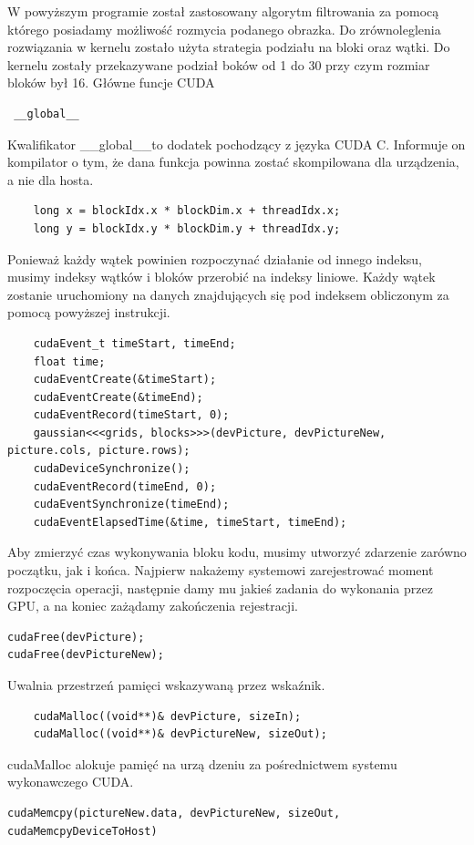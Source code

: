 \documentclass[a4paper,10pt]{article}
\begin{document}
W powyższym programie został zastosowany algorytm filtrowania za pomocą którego posiadamy możliwość rozmycia podanego obrazka. 
Do zrównoleglenia rozwiązania w kernelu zostało użyta strategia podziału na bloki oraz wątki. Do kernelu zostały przekazywane podział boków od 1 do 30 przy czym rozmiar bloków był 16.
\newline
Główne funcje CUDA
\begin{lstlisting}
 __global__
\end{lstlisting}
Kwalifikator \_\_global\_\_to dodatek pochodzący z języka CUDA C. Informuje on kompilator
o tym, że dana funkcja powinna zostać skompilowana dla urządzenia, a nie dla hosta. 
\newline
\begin{lstlisting}
	long x = blockIdx.x * blockDim.x + threadIdx.x;
	long y = blockIdx.y * blockDim.y + threadIdx.y; 
\end{lstlisting}
Ponieważ każdy wątek powinien rozpoczynać działanie od innego indeksu, musimy indeksy wątków i bloków przerobić na indeksy liniowe. Każdy wątek zostanie uruchomiony na danych znajdujących się pod indeksem obliczonym za pomocą powyższej instrukcji.
\newline
\begin{lstlisting}
	cudaEvent_t timeStart, timeEnd;
	float time;
	cudaEventCreate(&timeStart);
	cudaEventCreate(&timeEnd);
	cudaEventRecord(timeStart, 0);
	gaussian<<<grids, blocks>>>(devPicture, devPictureNew, picture.cols, picture.rows);
	cudaDeviceSynchronize();
	cudaEventRecord(timeEnd, 0);
	cudaEventSynchronize(timeEnd);
	cudaEventElapsedTime(&time, timeStart, timeEnd);
\end{lstlisting}
Aby zmierzyć czas wykonywania bloku kodu, musimy utworzyć zdarzenie zarówno początku, jak
i końca. Najpierw nakażemy systemowi zarejestrować moment rozpoczęcia operacji, następnie damy
mu jakieś zadania do wykonania przez GPU, a na koniec zażądamy zakończenia rejestracji.
\begin{lstlisting}
cudaFree(devPicture);
cudaFree(devPictureNew);
\end{lstlisting}
Uwalnia przestrzeń pamięci wskazywaną przez wskaźnik.
\newline
\begin{lstlisting}
	cudaMalloc((void**)& devPicture, sizeIn);
	cudaMalloc((void**)& devPictureNew, sizeOut);
\end{lstlisting}
cudaMalloc alokuje pamięć na urzą­
dzeniu za pośrednictwem systemu wykonawczego CUDA.
\begin{lstlisting}
cudaMemcpy(pictureNew.data, devPictureNew, sizeOut, cudaMemcpyDeviceToHost)
\end{lstlisting}
\end{document}
